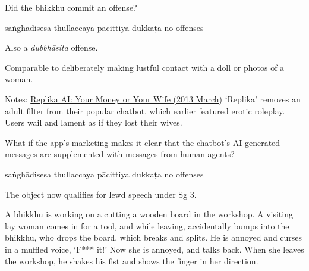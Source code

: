 \begin{exam}{\autoExamName}
\begin{problem*}
\begin{parts}
    \bigskip

    \item Did the bhikkhu commit an offense?

    \bigskip

    \begin{answers}{5}
        \bChoices
         saṅghādisesa\eAns
         thullaccaya\eAns
         pācittiya\eAns
         dukkaṭa\eAns
         no offenses\eAns
        \eChoices
    \end{answers}

    \begin{solution}
      Also a \emph{dubbhāsita} offense.

      Comparable to deliberately making lustful contact with a doll or photos of a woman.

      Notes:
      \href{https://news.ycombinator.com/item?id=35774093}{Replika AI: Your Money or Your Wife (2013 March)}
      `Replika' removes an adult filter from their popular chatbot, which earlier featured erotic roleplay.
      Users wail and lament as if they lost their wives.
    \end{solution}

    \bigskip

    \item What if the app's marketing makes it clear that the chatbot's AI-generated messages are supplemented with messages from human agents?

    \bigskip

    \begin{answers}{5}
        \bChoices
         saṅghādisesa\eAns
         thullaccaya\eAns
         pācittiya\eAns
         dukkaṭa\eAns
         no offenses\eAns
        \eChoices
    \end{answers}

    \begin{solution}
      The object now qualifies for lewd speech under Sg 3.
    \end{solution}

  \end{parts}

\end{problem*}

\problemDivide

\begin{problem}

  A bhikkhu is working on a cutting a wooden board in the workshop.
  A visiting lay woman comes in for a tool, and while leaving, accidentally bumps into the bhikkhu, who drops the board, which breaks and splits.
  He is annoyed and curses in a muffled voice, `F*** it!'
  Now she is annoyed, and talks back.
  When she leaves the workshop, he shakes his fist and shows the finger in her direction.


\end{problem}
\end{exam}
